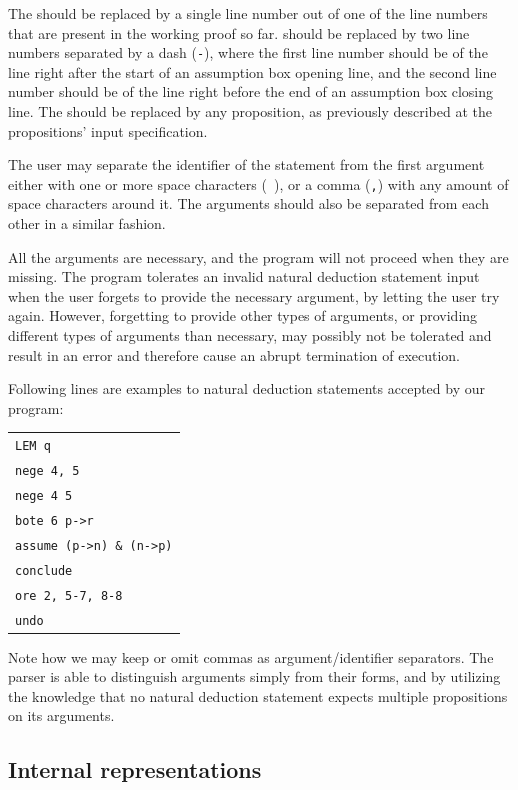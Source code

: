 \documentclass[12pt]{article}
\begin{document}
The \AN{} should be replaced by a single line number out of one of the
line numbers that are present in the working proof so far. \AR{} should
be replaced by two line numbers separated by a dash (\verb|-|), where
the first line number should be of the line right after the start of
an assumption box opening line, and the second line number should be of
the line right before the end of an assumption box closing line. 
The \AF{} should be replaced by any proposition, as previously described
at the propositions' input specification.

The user may separate the identifier of the statement from the first argument
either with one or more space characters (\verb| |), or a comma (\verb|,|)
with any amount of space characters around it. The arguments should also
be separated from each other in a similar fashion.

All the arguments are necessary, and the program will not proceed when
they are missing. The program tolerates an invalid natural deduction statement
input when the user forgets to provide the necessary \AF{} argument, by letting
the user try again. However, forgetting to provide other types of arguments,
or providing different types of arguments than necessary, may possibly not
be tolerated and result in an error and therefore cause an abrupt
termination of execution.

Following lines are examples to natural deduction statements accepted by
our program:

\begin{center}
	\begin{tabular}{l}
		\verb^LEM q^\\
		\verb^nege 4, 5^\\
		\verb^nege 4 5^\\
		\verb^bote 6 p->r^\\
		\verb^assume (p->n) & (n->p)^\\
		\verb^conclude^\\
		\verb^ore 2, 5-7, 8-8^\\
		\verb^undo^
	\end{tabular}
\end{center}

Note how we may keep or omit commas as argument/identifier separators.
The parser is able to distinguish arguments simply from their forms,
and by utilizing the knowledge that no natural deduction statement
expects multiple propositions on its arguments.

\subsection{Internal representations}\label{sec:inrep}
\end{document}
